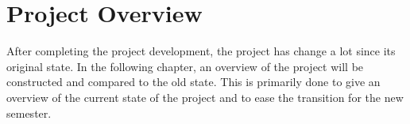 \chapter{Project Overview}\label{CAP:ProjectOverview}
After completing the project development, the project has change a lot since its original state. 
In the following chapter, an overview of the project will be constructed and compared to the old state. 
This is primarily done to give an overview of the current state of the project and to ease the transition for the new semester. 



